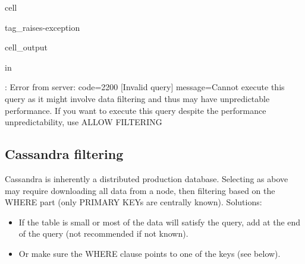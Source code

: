 \documentclass[letterpaper,10pt,english]{jupyterBook}
\begin{document}
\begin{sphinxuseclass}{cell}
\begin{sphinxuseclass}{tag_raises-exception}
\begin{sphinxVerbatimOutput}
\begin{sphinxuseclass}{cell_output}
\begin{sphinxVerbatim}[commandchars=\\\{\}]
 in 
       
 
      

: Error from server: code=2200 [Invalid query] message=\PYGZdq{}Cannot execute this query as it might involve data filtering and thus may have unpredictable performance. If you want to execute this query despite the performance unpredictability, use ALLOW FILTERING\PYGZdq{}
\end{sphinxVerbatim}

\end{sphinxuseclass}\end{sphinxVerbatimOutput}

\end{sphinxuseclass}
\end{sphinxuseclass}

\subsection{Cassandra filtering}
\label{\detokenize{2_Data_sources/Databases/Cassandra:cassandra-filtering}}
\sphinxAtStartPar
Cassandra is inherently a distributed production database. Selecting as above may require downloading all data from a node, then filtering based on the WHERE part (only PRIMARY KEYs are centrally known). Solutions:
\begin{itemize}
\item {} 
\sphinxAtStartPar
If the table is small or most of the data will satisfy the query, add  at the end of the query (not recommended if not known).

\item {} 
\sphinxAtStartPar
Or make sure the WHERE clause points to one of the keys (see below).

\end{itemize}
\end{document}
